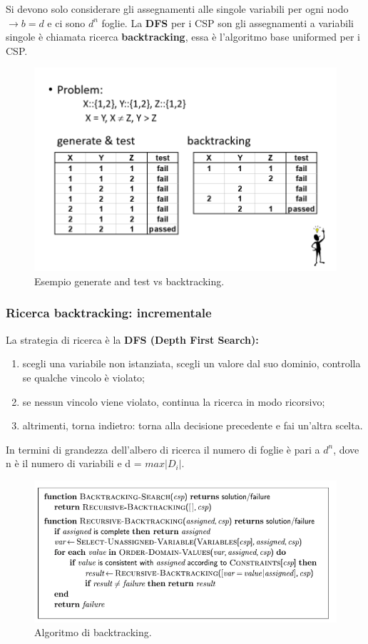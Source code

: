 \noindent Si devono solo considerare gli assegnamenti alle singole variabili per ogni nodo $\longrightarrow b = d $ e ci sono $d^n$ foglie.
La \textbf{DFS} per i CSP son gli assegnamenti a variabili singole è chiamata ricerca \textbf{backtracking}, essa è l'algoritmo base uniformed per i CSP.

\begin{figure}[H]
	\centering
    \includegraphics[width=13.5cm, keepaspectratio]{img/diff_generate_backtracking.png}
	\caption{Esempio generate and test vs backtracking.}\label{fig:diff_generate_backtracking}
\end{figure}

\subsubsection{Ricerca backtracking: incrementale}
La strategia di ricerca è la\textbf{ DFS (Depth First Search):}
\begin{enumerate}
    \item scegli una variabile non istanziata, scegli un valore dal suo dominio, controlla se qualche vincolo è violato;
    \item se nessun vincolo viene violato, continua la ricerca in modo ricorsivo;
    \item altrimenti, torna indietro: torna alla decisione precedente e fai un'altra scelta.
\end{enumerate}
In termini di grandezza dell'albero di ricerca il numero di foglie è pari a $d^n$, dove n è il numero di variabili e d = $max|D_i|$.
\begin{figure}[H]
	\centering
    \includegraphics[width=14cm, keepaspectratio]{img/alg_backtracking.png}
	\caption{Algoritmo di backtracking.}\label{fig:alg_backtracking}
\end{figure}

